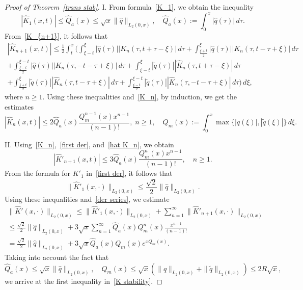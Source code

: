 \documentclass[10pt,a4paper]{amsart}
\begin{document}
\begin{proof}[Proof of Theorem~\ref{trans stab}]
I. 
From formula~\eqref{K_1}, we obtain the inequality
\begin{equation*} \label{ind base}
|\hat K_1(x, t)| \le \hat Q_a(x) \le \sqrt{x} \| \hat q\|_{L_2(0, x)}, \quad \hat Q_a(x) := \int_0^x |\hat q(\tau)|\,d\tau.
\end{equation*}
From~\eqref{K_{n+1}}, it follows that
\begin{equation*}
\begin{split}
|\hat K_{n+1}(x, t)| \le \frac12 \int_t^x\Bigg( \int_{\xi-t}^\xi |\hat q(\tau)| |K_n(\tau,t+\tau-\xi)|\,d\tau +\int_{\frac{\xi+t}{2}}^\xi |\hat q(\tau)| |K_n(\tau,t-\tau+\xi)|\,d\tau \\
+\int_{\frac{\xi-t}{2}}^{\xi-t} |\hat q(\tau)| |K_n(\tau,-t-\tau+\xi)|\,d\tau +  \int_{\xi-t}^\xi |\tilde q(\tau)| |\hat K_n(\tau,t+\tau-\xi)|\,d\tau \\
+\int_{\frac{\xi+t}{2}}^\xi |\tilde q(\tau)||\hat K_n(\tau,t-\tau+\xi)|\,d\tau + \int_{\frac{\xi-t}{2}}^{\xi-t} |\tilde q(\tau)||\hat K_n(\tau,-t-\tau+\xi)|\,d\tau\Bigg) \,d\xi,
\end{split}
\end{equation*}
where $n \ge 1.$
Using these inequalities and~\eqref{K_n}, by induction, we get the estimates
\begin{equation} \label{hat K_n}
|\hat K_n(x, t)|\le 2 \hat Q_a(x) \frac{Q_{m}^{n-1}(x) x^{n-1}}{(n-1)!}, \; n \ge 1, \quad Q_{m}(x) := \int_0^x \max\{ |q(\xi)|, |\tilde q(\xi)|\}\, d\xi.
\end{equation}


II. Using~\eqref{K_n},~\eqref{first der}, and~\eqref{hat K_n}, we obtain
$$|\hat K'_{n+1}(x, t)| \le 3\hat Q_a(x) \frac{Q^{n}_{m}(x) x^{n-1}}{(n-1)!}, \quad n \ge 1.$$
From the formula for $K'_1$ in~\eqref{first der}, it follows that
$$\| \hat K'_1(x, \cdot) \|_{L_2(0,x)} \le \frac{\sqrt2}{2}\| \hat q\|_{L_2(0, x)}.$$
Using these inequalities and~\eqref{der series}, we estimate
\begin{equation*}\begin{split}
\|\hat K'(x, \cdot)\|_{L_2(0, x)} \le \big\| \hat K'_1(x, \cdot) \big\|_{L_2(0,x)} + \sum_{n=1}^\infty \big\| \hat K'_{n+1}(x, \cdot) \big\|_{L_2(0,x)} \\
\le \frac{\sqrt2}{2}\| \hat q\|_{L_2(0, x)}
+ 3\sqrt x \sum_{n=1}^\infty \hat Q_a(x) Q^n_{m}(x) \frac{x^{n-1}}{(n-1)!}\\
= \frac{\sqrt2}{2}\| \hat q\|_{L_2(0, x)} +
3\sqrt x \hat Q_a(x) Q_{m}(x) e^{x Q_m(x)}.
\end{split}
\end{equation*}
Taking into account the fact that
\begin{equation} \label{Q_a}
\hat Q_a(x) \le \sqrt{x} \| \hat q \|_{L_2(0, x)}, \quad Q_{m}(x) \le \sqrt x (\| q\|_{L_2(0, x)} + \| \tilde q\|_{L_2(0, x)}) \le 2 R\sqrt x,
\end{equation}
we arrive at the first inequality in~\eqref{K stability}.


\end{proof}
\end{document}
